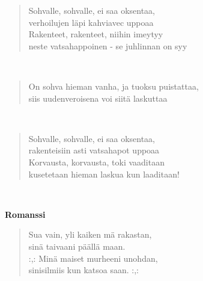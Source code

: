 \noindent\begin{minipage}{\linewidth}
\begin{verse}
	Sohvalle, sohvalle, ei saa oksentaa,\\
	verhoilujen läpi kahviavec uppoaa\\
	Rakenteet, rakenteet, niihin imeytyy\\
	neste vatsahappoinen - se juhlinnan on syy\\
\end{verse}
\end{minipage}\\[10pt]
\noindent\begin{minipage}{\linewidth}
\begin{verse}
	On sohva hieman vanha, ja tuoksu puistattaa,\\
	siis uudenveroisena voi siitä laskuttaa\\
\end{verse}
\end{minipage}\\[10pt]
\noindent\begin{minipage}{\linewidth}
\begin{verse}
	Sohvalle, sohvalle, ei saa oksentaa,\\
	rakenteisiin asti vatsahapot uppoaa\\
	Korvausta, korvausta, toki vaaditaan\\
	kusetetaan hieman laskua kun laaditaan!\\
\end{verse}
\end{minipage}\\[10pt]
%
%
\noindent\begin{minipage}{\linewidth}
\vspace{5pt}
\parbox[t]{0.85\linewidth}{\raggedright {\large\bf Romanssi}\\[6pt]}
\begin{verse}
	Sua vain, yli kaiken mä rakastan,\\
	sinä taivaani päällä maan.\\
	\hspace{0pt-\widthof{:,: }}:,: Minä maiset murheeni unohdan,\\
	sinisilmiis kun katsoa saan. :,:\\
\end{verse}
\end{minipage}\\[10pt]
